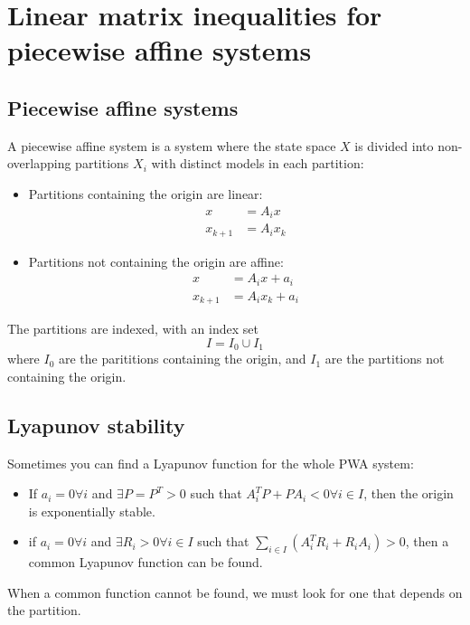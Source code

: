 \section{Linear matrix inequalities for piecewise affine systems}

\subsection{Piecewise affine systems}
A piecewise affine system is a system where the state space $X$ is divided into non-overlapping partitions $X_i$ with distinct models in each partition:
%
\begin{itemize}
  \item Partitions containing the origin are linear:
  \begin{equation}
  \begin{split}
    x &= A_i x \\
    x_{k+1} &= A_i x_k
  \end{split}
  \end{equation}
  \item Partitions not containing the origin are affine:
  \begin{equation}
  \begin{split}
    x &= A_i x + a_i \\
    x_{k+1} &= A_i x_k + a_i
  \end{split}
  \end{equation}
\end{itemize}

The partitions are indexed, with an index set
%
\begin{equation}
  I = I_0 \cup I_1
\end{equation}
%
where $I_0$ are the parititions containing the origin, and $I_1$ are the partitions not containing the origin.

\subsection{Lyapunov stability}
Sometimes you can find a Lyapunov function for the whole PWA system:
%
\begin{itemize}
  \item If $a_i = 0 \forall i$ and $\exists P = P^T > 0$ such that $A_i^T P + P A_i < 0 \forall i \in I$, then the origin is exponentially stable.
  \item if  $a_i = 0 \forall i$ and $\exists R_i > 0 \forall i \in I$ such that $\sum_{i \in I} (A_i^T R_i + R_i A_i) > 0$, then a common Lyapunov function can be found.
\end{itemize}
%
When a common function cannot be found, we must look for one that depends on the partition.

